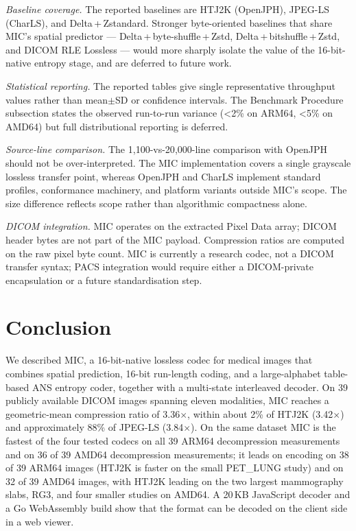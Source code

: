 \documentclass[journal]{IEEEtran}
\begin{document}
\textit{Baseline coverage.} The reported baselines are HTJ2K
(OpenJPH), JPEG-LS (CharLS), and Delta\,+\,Zstandard. Stronger
byte-oriented baselines that share MIC's spatial predictor ---
Delta\,+\,byte-shuffle\,+\,Zstd, Delta\,+\,bitshuffle\,+\,Zstd, and
DICOM RLE Lossless --- would more sharply isolate the value of the
16-bit-native entropy stage, and are deferred to future work.

\textit{Statistical reporting.} The reported tables give single
representative throughput values rather than mean$\pm$SD or
confidence intervals. The Benchmark Procedure subsection states the
observed run-to-run variance (\textless 2\% on ARM64,
\textless 5\% on AMD64) but full distributional reporting is
deferred.

\textit{Source-line comparison.} The 1{,}100-vs-20{,}000-line
comparison with OpenJPH should not be over-interpreted. The MIC
implementation covers a single grayscale lossless transfer point,
whereas OpenJPH and CharLS implement standard profiles, conformance
machinery, and platform variants outside MIC's scope. The size
difference reflects scope rather than algorithmic compactness alone.

\textit{DICOM integration.} MIC operates on the extracted Pixel Data
array; DICOM header bytes are not part of the MIC payload.
Compression ratios are computed on the raw pixel byte count. MIC is
currently a research codec, not a DICOM transfer syntax; PACS
integration would require either a DICOM-private encapsulation or a
future standardisation step.

\section{Conclusion}
\label{sec:conclusion}

We described MIC, a 16-bit-native lossless codec for medical images
that combines spatial prediction, 16-bit run-length coding, and a
large-alphabet table-based ANS entropy coder, together with a
multi-state interleaved decoder. On 39 publicly available DICOM images
spanning eleven modalities, MIC reaches a geometric-mean compression
ratio of 3.36$\times$, within about 2\% of HTJ2K (3.42$\times$) and
approximately 88\% of JPEG-LS (3.84$\times$). On the same
dataset MIC is the fastest of the four tested codecs on all 39 ARM64
decompression measurements and on 36 of 39 AMD64 decompression
measurements; it leads on encoding on 38 of 39 ARM64 images (HTJ2K is
faster on the small PET\_LUNG study) and on 32 of 39 AMD64 images,
with HTJ2K leading on the two largest mammography slabs, RG3, and four
smaller studies on AMD64. A 20\,KB JavaScript
decoder and a Go WebAssembly build show that the format can be decoded
on the client side in a web viewer.
\end{document}
